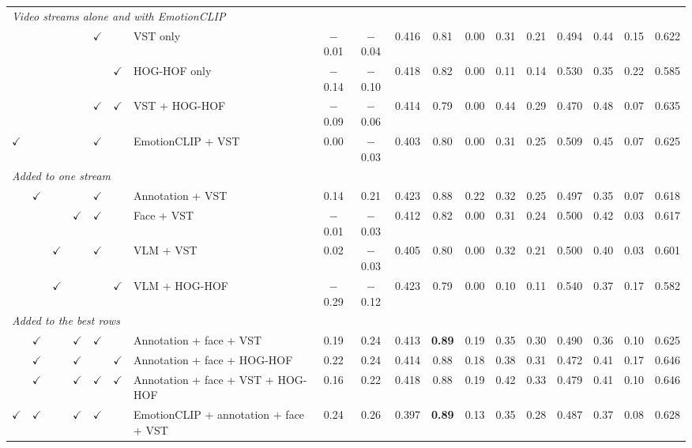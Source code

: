 \documentclass[11pt]{article}
\newcommand{\best}[1]{\textbf{#1}}
\begin{document}
\begin{table}[!htbp]
{\begin{tabular}{cccccclccccccccccc}
\midrule
\multicolumn{18}{l}{\emph{Video streams alone and with EmotionCLIP}} \\
 &  &  &  & $\checkmark$ &  & VST only & $-$0.01 & $-$0.04 & 0.416 & 0.81 & 0.00 & 0.31 & 0.21 & 0.494 & 0.44 & 0.15 & 0.622 \\
 &  &  &  &  & $\checkmark$ & HOG-HOF only & $-$0.14 & $-$0.10 & 0.418 & 0.82 & 0.00 & 0.11 & 0.14 & 0.530 & 0.35 & 0.22 & 0.585 \\
 &  &  &  & $\checkmark$ & $\checkmark$ & VST + HOG-HOF & $-$0.09 & $-$0.06 & 0.414 & 0.79 & 0.00 & 0.44 & 0.29 & 0.470 & 0.48 & 0.07 & 0.635 \\
$\checkmark$ &  &  &  & $\checkmark$ &  & EmotionCLIP + VST & 0.00 & $-$0.03 & 0.403 & 0.80 & 0.00 & 0.31 & 0.25 & 0.509 & 0.45 & 0.07 & 0.625 \\
\midrule
\multicolumn{18}{l}{\emph{Added to one stream}} \\
 & $\checkmark$ &  &  & $\checkmark$ &  & Annotation + VST & 0.14 & 0.21 & 0.423 & 0.88 & 0.22 & 0.32 & 0.25 & 0.497 & 0.35 & 0.07 & 0.618 \\
 &  &  & $\checkmark$ & $\checkmark$ &  & Face + VST & $-$0.01 & $-$0.03 & 0.412 & 0.82 & 0.00 & 0.31 & 0.24 & 0.500 & 0.42 & 0.03 & 0.617 \\
 &  & $\checkmark$ &  & $\checkmark$ &  & VLM + VST & 0.02 & $-$0.03 & 0.405 & 0.80 & 0.00 & 0.32 & 0.21 & 0.500 & 0.40 & 0.03 & 0.601 \\
 &  & $\checkmark$ &  &  & $\checkmark$ & VLM + HOG-HOF & $-$0.29 & $-$0.12 & 0.423 & 0.79 & 0.00 & 0.10 & 0.11 & 0.540 & 0.37 & 0.17 & 0.582 \\
\midrule
\multicolumn{18}{l}{\emph{Added to the best rows}} \\
 & $\checkmark$ &  & $\checkmark$ & $\checkmark$ &  & Annotation + face + VST & 0.19 & 0.24 & 0.413 & \best{0.89} & 0.19 & 0.35 & 0.30 & 0.490 & 0.36 & 0.10 & 0.625 \\
 & $\checkmark$ &  & $\checkmark$ &  & $\checkmark$ & Annotation + face + HOG-HOF & 0.22 & 0.24 & 0.414 & 0.88 & 0.18 & 0.38 & 0.31 & 0.472 & 0.41 & 0.17 & 0.646 \\
 & $\checkmark$ &  & $\checkmark$ & $\checkmark$ & $\checkmark$ & Annotation + face + VST + HOG-HOF & 0.16 & 0.22 & 0.418 & 0.88 & 0.19 & 0.42 & 0.33 & 0.479 & 0.41 & 0.10 & 0.646 \\
$\checkmark$ & $\checkmark$ &  & $\checkmark$ & $\checkmark$ &  & EmotionCLIP + annotation + face + VST & 0.24 & 0.26 & 0.397 & \best{0.89} & 0.13 & 0.35 & 0.28 & 0.487 & 0.37 & 0.08 & 0.628 \\

\end{tabular}}
\end{table}
\end{document}
